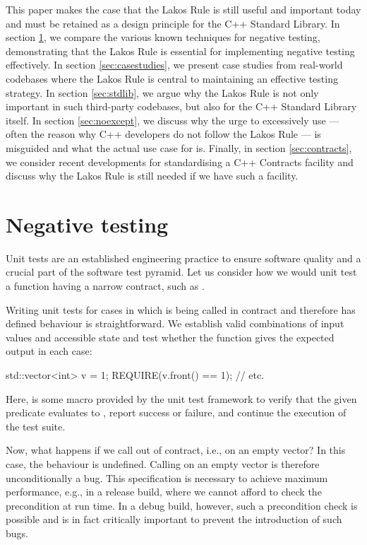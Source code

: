 This paper makes the case that the Lakos Rule is still useful and important today and must be retained as a design principle for the C++ Standard Library. In section \ref{sec:negativetest}, we compare the various known techniques for negative testing, demonstrating that the Lakos Rule is essential for implementing negative testing effectively. In section \ref{sec:casestudies}, we present case studies from real-world codebases where the Lakos Rule is central to maintaining an effective testing strategy. In section \ref{sec:stdlib}, we argue why the Lakos Rule is not only important in such third-party codebases, but also for the C++ Standard Library itself. In section \ref{sec:noexcept}, we discuss why the urge to excessively use  --- often the reason why C++ developers do not follow the Lakos Rule --- is misguided and what the actual use case for  is. Finally, in section \ref{sec:contracts}, we consider recent developments for standardising a C++ Contracts facility and discuss why the Lakos Rule is still needed if we have such a facility.

\section{Negative testing}
\label{sec:negativetest}

Unit tests are an established engineering practice to ensure software quality and a crucial part of the software test pyramid. Let us consider how we would unit test a function having a narrow contract, such as .

Writing unit tests for cases in which  is being called in contract and therefore has defined behaviour is straightforward. We establish valid combinations of input values and accessible state and test whether the function gives the expected output in each case:
\begin{codeblock}
std::vector<int> v = {1};
REQUIRE(v.front() == 1);
// etc.
\end{codeblock}
Here,  is some macro provided by the unit test framework to verify that the given predicate evaluates to , report success or failure, and continue the execution of the test suite.

Now, what happens if we call  out of contract, i.e., on an empty vector? In this case, the behaviour is undefined. Calling  on an empty vector is therefore unconditionally a bug. This specification is necessary to achieve maximum performance, e.g., in a release build, where we cannot afford to check the precondition at run time. In a debug build, however, such a precondition check is possible and is in fact critically important to prevent the introduction of such bugs.

